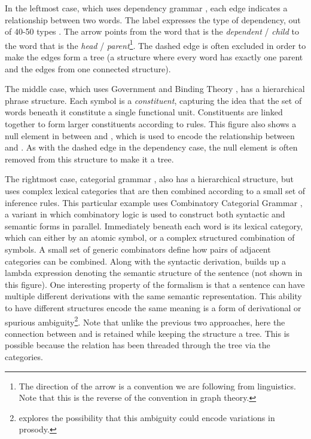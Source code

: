 In the leftmost case, which uses dependency grammar \parencite[\depgr;][]{dependency-grammar}, each edge indicates a relationship between two words.
The label expresses the type of dependency, out of 40-50 types \parencite{ud,sd}.
The arrow points from the word that is the \textit{dependent} / \textit{child} to the word that is the \textit{head} / \textit{parent}\footnote{The direction of the arrow is a convention we are following from linguistics. Note that this is the reverse of the convention in graph theory.}.
The dashed edge is often excluded in order to make the edges form a tree (a structure where every word has exactly one parent and the edges from one connected structure).

The middle case, which uses Government and Binding Theory \parencite[\gb;][]{gb}, has a hierarchical phrase structure.
Each symbol is a \textit{constituent}, capturing the idea that the set of words beneath it constitute a single functional unit.
Constituents are linked together to form larger constituents according to rules.
This figure also shows a null element in between  and , which is used to encode the relationship between  and .
As with the dashed edge in the dependency case, the null element is often removed from this structure to make it a tree.

The rightmost case, categorial grammar \parencite{categorial-grammar}, also has a hierarchical structure, but uses complex lexical categories that are then combined according to a small set of inference rules.
This particular example uses Combinatory Categorial Grammar \parencite[\ccg;][]{Steedman:2000}, a variant in which combinatory logic is used to construct both syntactic and semantic forms in parallel.
Immediately beneath each word is its lexical category, which can either by an atomic symbol, or a complex structured combination of symbols.
A small set of generic combinators define how pairs of adjacent categories can be combined.
Along with the syntactic derivation, \ccg builds up a lambda expression denoting the semantic structure of the sentence (not shown in this figure). %
One interesting property of the formalism is that a sentence can have multiple different derivations with the same semantic representation.
This ability to have different structures encode the same meaning is a form of derivational or spurious ambiguity\footnote{\textcite{Steedman:2000} explores the possibility that this ambiguity could encode variations in prosody.}.
Note that unlike the previous two approaches, here the connection between  and  is retained while keeping the structure a tree.
This is possible because the relation has been threaded through the tree via the categories.

